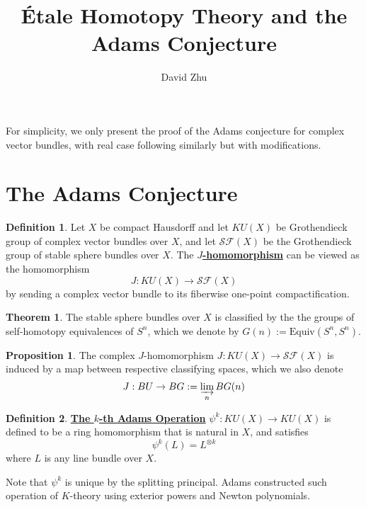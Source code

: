 \documentclass{article}
\title{\'Etale Homotopy Theory and the Adams Conjecture}
\author{David Zhu}
\theoremstyle{definition}
\newtheorem{theorem}{Theorem}[section]
\theoremstyle{definition}
\newtheorem{definition}{Definition}[theorem]
\theoremstyle{definition}
\theoremstyle{definition}
\newtheorem{proposition}{Proposition}[theorem]
\theoremstyle{definition}
\theoremstyle{definition}
\theoremstyle{definition}
\begin{document}
\maketitle

For simplicity, we only present the proof of the Adams conjecture for complex vector bundles, with real case following similarly but with modifications.

\section{The Adams Conjecture}
\begin{tcolorbox}[colback=purple!5!white,colframe=purple!75!black]
	\begin{definition}
	Let $X$ be compact Hausdorff and let $KU(X)$ be Grothendieck group of complex vector bundles over $X$, and let $\mathcal{SF}(X)$ be the Grothendieck group of stable sphere bundles over $X$. The \underline{\textbf{$J$-homomorphism}} can be viewed as the homomorphism
	\[J: KU(X)\to \mathcal{SF}(X)\]
	by sending a complex vector bundle to its fiberwise one-point compactification. 
	\end{definition}
	\end{tcolorbox}

	
	\begin{tcolorbox}[colback=red!5!white,colframe=red!30!white]
		\begin{theorem}
		The stable sphere bundles over $X$ is classified by the the groups of self-homotopy equivalences of $S^n$, which we denote by $G(n):=\textrm{Equiv}(S^n,S^n)$. 
		\end{theorem}
		\end{tcolorbox}
		

	\begin{tcolorbox}[colback=blue!5!white,colframe=blue!30!white]
		\begin{proposition}
		The complex $J$-homomorphism $J: KU(X)\to \mathcal{SF}(X)$ is induced by a map between respective classifying spaces, which we also denote 
		\[J: BU\to BG:=\varinjlim_{n} BG(n)\]
		\end{proposition}
		\end{tcolorbox}


	
	
	
	
	\begin{tcolorbox}[colback=purple!5!white,colframe=purple!75!black]
	\begin{definition}
	\underline{\textbf{The $k$-th Adams Operation}} $\psi^k: KU(X)\to KU(X)$ is defined to be a ring homomorphism that is natural in $X$, and satisfies 
	\[\psi^k(L)=L^{\otimes k}\]
	where $L$ is any line bundle over $X$. 	
	\end{definition}
	\end{tcolorbox}
	Note that $\psi^k$ is unique by the splitting principal. Adams constructed such operation of $K$-theory using exterior powers and Newton polynomials.
	
\end{document}
